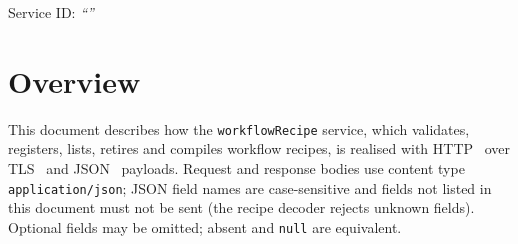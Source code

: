 \documentclass[a4paper]{arrowhead}
\begin{document}
\ArrowheadSetup

\begin{center}
  \vspace*{1cm}
  \huge{\arrowtitle}

  \vspace*{0.2cm}
  \LARGE{\arrowtype}
  \vspace*{1cm}

  \Large{Service ID: \textit{``\arrowid''}}
  \vspace*{\fill}

  

  \vspace*{1cm}
  \vspace*{\fill}

  \begin{abstract}
    This document describes the HTTP/TLS/JSON interface of the \texttt{workflowRecipe} service of the Eclipse Arrowhead workflow support systems, service version 1.0.0, documentation edition 5.4.0. It realises the abstract operations of the \texttt{workflowRecipe} SD.
  \end{abstract}

  \vspace*{1cm}
\end{center}

\newpage

\tableofcontents
\newpage

\section{Overview}
\label{sec:overview}
This document describes how the \texttt{workflowRecipe} service, which validates, registers, lists, retires and compiles workflow recipes, is realised with HTTP~\cite{rfc9110}
over TLS~\cite{rfc8446} and JSON~\cite{rfc8259} payloads. Request and response bodies use content type
\texttt{application/json}; JSON field names are case-sensitive and fields not listed in this document must not be sent
(the recipe decoder rejects unknown fields). Optional fields may be omitted; absent and \texttt{null} are equivalent.
\end{document}
